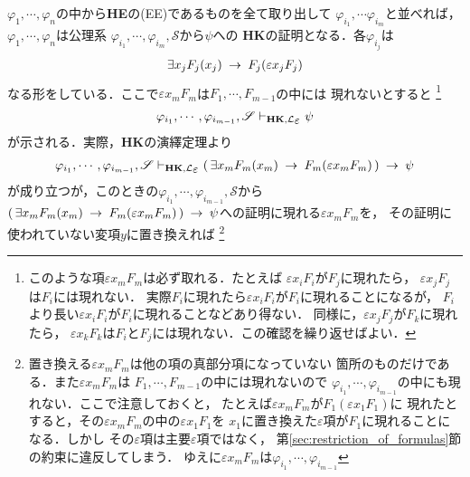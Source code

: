 	\begin{sketch}
		$\varphi_{1},\cdots,\varphi_{n}$の中から{\bf HE}の(EE)であるものを全て取り出して
		$\varphi_{i_{1}},\cdots\varphi_{i_{m}}$と並べれば，
		$\varphi_{1},\cdots,\varphi_{n}$は公理系
		$\varphi_{i_{1}},\cdots,\varphi_{i_{m}},\mathscr{S}$から$\psi$への
		{\bf HK}の証明となる．各$\varphi_{i_{j}}$は
		\begin{align}
			\exists x_{j} F_{j}(x_{j}) \hspace{0.25em}\rightarrow\hspace{0.25em} F_{j}(\varepsilon x_{j} F_{j})
		\end{align}
		なる形をしている．ここで$\varepsilon x_{m} F_{m}$は$F_{1},\cdots,F_{m-1}$の中には
		現れないとすると
		\footnote{
			このような項$\varepsilon x_{m} F_{m}$は必ず取れる．たとえば
			$\varepsilon x_{i} F_{i}$が$F_{j}$に現れたら，
			$\varepsilon x_{j} F_{j}$は$F_{i}$には現れない．
			実際$F_{i}$に現れたら$\varepsilon x_{i} F_{i}$が$F_{i}$に現れることになるが，
			$F_{i}$より長い$\varepsilon x_{i} F_{i}$が$F_{i}$に現れることなどあり得ない．
			同様に，$\varepsilon x_{j} F_{j}$が$F_{k}$に現れたら，
			$\varepsilon x_{k} F_{k}$は$F_{i}$と$F_{j}$には現れない．この確認を繰り返せばよい．
		}
		\begin{align}
			\varphi_{i_{1}},\cdots,\varphi_{i_{m-1}},\mathscr{S} 
			\provable{\mbox{{\bf HK}},\lang{\varepsilon}} \psi
		\end{align}
		が示される．実際，{\bf HK}の演繹定理より
		\begin{align}
			\varphi_{i_{1}},\cdots,\varphi_{i_{m-1}},\mathscr{S} 
			\provable{\mbox{{\bf HK}},\lang{\varepsilon}} 
			(\, \exists x_{m} F_{m}(x_{m}) \rarrow F_{m}(\varepsilon x_{m} F_{m})\, ) \rarrow \psi
		\end{align}
		が成り立つが，このときの$\varphi_{i_{1}},\cdots,\varphi_{i_{m-1}},\mathscr{S}$から
		$(\, \exists x_{m} F_{m}(x_{m}) \hspace{0.25em}\rightarrow\hspace{0.25em} F_{m}(\varepsilon x_{m} F_{m})\, ) 
		\hspace{0.25em}\rightarrow\hspace{0.25em} \psi$への証明に現れる$\varepsilon x_{m} F_{m}$を，
		その証明に使われていない変項$y$に置き換えれば
		\footnote{
			置き換える$\varepsilon x_{m} F_{m}$は他の項の真部分項になっていない
			箇所のものだけである．また$\varepsilon x_{m} F_{m}$は
			$F_{1},\cdots,F_{m-1}$の中には現れないので
			$\varphi_{i_{1}},\cdots,\varphi_{i_{m-1}}$の中にも現れない．ここで注意しておくと，
			たとえば$\varepsilon x_{m} F_{m}$が$F_{1}(\varepsilon x_{1} F_{1})$に
			現れたとすると，その$\varepsilon x_{m} F_{m}$の中の$\varepsilon x_{1} F_{1}$を
			$x_{1}$に置き換えた$\varepsilon$項が$F_{1}$に現れることになる．しかし
			その$\varepsilon$項は主要$\varepsilon$項ではなく，
			第\ref{sec:restriction_of_formulas}節の約束に違反してしまう．
			ゆえに$\varepsilon x_{m} F_{m}$は$\varphi_{i_{1}},\cdots,\varphi_{i_{m-1}}$
}
\end{sketch}
